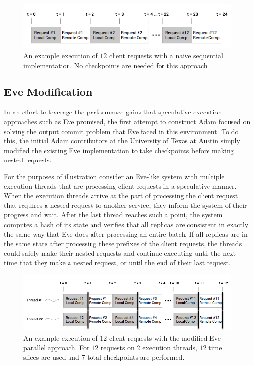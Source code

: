 \documentclass[11pt, oneside]{report}
\begin{document}
\begin{figure}[h]
\centering
\includegraphics[width=1.0\textwidth]{NaiveSequential.png}
\caption{\label{NaiveSequential}An example execution of $12$ client requests with a naive sequential implementation. No checkpoints are needed for this approach.}
\end{figure}

\subsection{Eve Modification}\label{EveModification}

In an effort to leverage the performance gains that speculative execution approaches such as Eve promised, the first attempt to construct Adam focused on solving the output commit problem that Eve faced in this environment. 
To do this, the initial Adam contributors at the University of Texas at Austin simply modified the existing Eve implementation to take checkpoints before making nested requests. 

For the purposes of illustration consider an Eve-like system with multiple execution threads that are processing client requests in a speculative manner. 
When the execution threads arrive at the part of processing the client request that requires a nested request to another service, they inform the system of their progress and wait. 
After the last thread reaches such a point, the system computes a hash of its state and verifies that all replicas are consistent in exactly the same way that Eve does after processing an entire batch. 
If all replicas are in the same state after processing these prefixes of the client requests, the threads could safely make their nested requests and continue executing until the next time that they make a nested request, or until the end of their last request.

\begin{figure}[h]
\centering
\includegraphics[width=1.0\textwidth]{Parallel.png}
\caption{\label{parallel}An example execution of $12$ client requests with the modified Eve parallel approach. For $12$ requests on $2$ execution threads, $12$ time slices are used and $7$ total checkpoints are performed.}
\end{figure}
\end{document}
